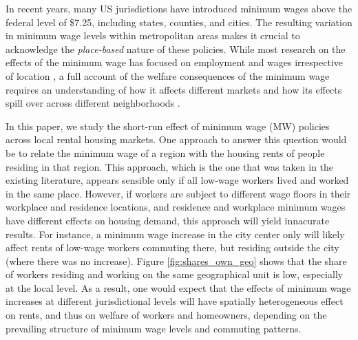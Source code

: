

In recent years, many US jurisdictions have introduced minimum wages above the 
federal level of \$7.25, including states, counties, and cities.
The resulting variation in minimum wage levels within metropolitan areas makes it 
crucial to acknowledge the \textit{place-based} nature of these policies.
While most research on the effects of the minimum wage has focused on employment 
and wages irrespective of location 
\parencite[e.g.,][]{CardKrueger1994, AutorEtAl2016, CegnizEtAl2019}, 
a full account of the welfare consequences of the minimum wage requires an 
understanding of how it affects different markets and how its effects spill over 
across different neighborhoods \parencite[as recently emphasized by][]{DubeLindner2021}.

In this paper, we study the short-run effect of minimum wage (MW) policies across 
local rental housing markets.
One approach to answer this question would be to relate the minimum wage of a region
with the housing rents of people residing in that region.
This approach, which is the one that was taken in the existing literature, appears 
sensible only if all low-wage workers lived and worked in the same place.
However, if workers are subject to different wage floors in their workplace and
residence locations, and residence and workplace minimum wages have different 
effects on housing demand, this approach will yield innacurate results.
For instance, a minimum wage increase in the city center only will likely affect 
rents of low-wage workers commuting there, but residing outside the city (where 
there was no increase).
Figure \ref{fig:shares_own_geo} shows that the share of workers residing and working 
on the same geographical unit is low, especially at the local level.
As a result, one would expect that the effects of minimum wage increases at different 
jurisdictional levels will have spatially heterogeneous effect on rents, and thus 
on welfare of workers and homeowners, depending on the prevailing structure of 
minimum wage levels and commuting patterns.

